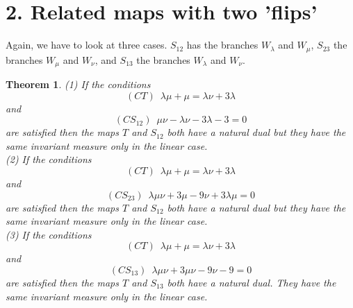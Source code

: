 \documentclass[12pt]{article}
\newtheorem{theorem}{Theorem}
\begin{document}
	\section*{2. Related maps with two 'flips'}
	Again, we have to look at three cases. $S_{12}$ has the branches $W_{\lambda}$ and $W_{\mu}$, $S_{23}$ the branches $W_{\mu}$ and $W_{\nu}$, and $S_{13}$ the branches $W_{\lambda}$ and $W_{\nu}$.
	\begin{theorem}
	(1) If the conditions 
	$$(CT) \, \, \, \lambda \mu + \mu = \lambda \nu + 3 \lambda$$ and
	$$(CS_{12}) \, \, \, \mu \nu - \lambda \nu - 3\lambda -3 =0$$ are satisfied then the maps $T$ and $S_{12}$ both have a natural dual but they have the same invariant measure only in the linear case. \\
	(2) If the conditions 
	$$(CT) \, \, \, \lambda \mu + \mu = \lambda \nu + 3 \lambda$$ and
	$$(CS_{23}) \, \, \, \lambda \mu \nu + 3\mu - 9 \nu +3 \lambda \mu  =0$$ are satisfied then the maps $T$ and $S_{12}$ both have a natural dual but they have the same invariant measure only in the linear case. \\
	(3) If the conditions 
	$$(CT) \, \, \, \lambda \mu  + \mu = \lambda \nu  + 3 \lambda$$ and
	$$(CS_{13}) \, \, \, \lambda \mu \nu + 3\mu \nu - 9 \nu -9 =0$$ are satisfied then the maps $T$ and $S_{13}$ both have a natural dual. They have the same invariant measure only in the linear case. 
	\end{theorem}
\end{document}
